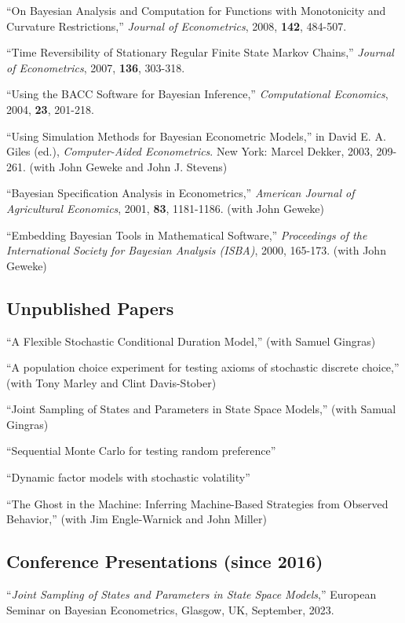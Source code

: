 \documentclass[12pt]{article}
\begin{document}
``On Bayesian Analysis and Computation for Functions with Monotonicity and Curvature Restrictions,''  {\it Journal of Econometrics}, 2008,
{\bf 142}, 484-507.

``Time Reversibility of Stationary Regular Finite State Markov Chains,''  {\it Journal of Econometrics},
2007,
{\bf 136}, 303-318.

``Using the BACC Software for Bayesian Inference,'' {\it Computational Economics},
2004,
{\bf 23}, 201-218.

``Using Simulation Methods for Bayesian Econometric Models,''  in  David E. A. Giles (ed.), {\it Computer-Aided Econometrics}.
New York: Marcel Dekker, 2003, 209-261. (with John Geweke and John J. Stevens)

``Bayesian Specification Analysis in Econometrics,''  {\it American Journal of Agricultural Economics},
2001,
{\bf 83}, 1181-1186. (with John Geweke)

``Embedding Bayesian Tools in Mathematical Software,''  {\it Proceedings of the International Society for Bayesian Analysis (ISBA)}, 
2000, 165-173.
 (with John Geweke)

\subsection*{Unpublished Papers}

``A Flexible Stochastic Conditional Duration Model,''
(with Samuel Gingras)

``A population choice experiment for testing axioms of stochastic discrete choice,''
(with Tony Marley and Clint Davis-Stober)

``Joint Sampling of States and Parameters in State Space Models,''
(with Samual Gingras)

``Sequential Monte Carlo for testing random preference''

``Dynamic factor models with stochastic volatility''

``The Ghost in the Machine: Inferring Machine-Based Strategies from Observed Behavior,'' (with Jim Engle-Warnick and John Miller)

\subsection*{Conference Presentations (since 2016)}

``{\it Joint Sampling of States and Parameters in State Space Models},''
European Seminar on Bayesian Econometrics,
Glasgow, UK,
September, 2023.
\end{document}
